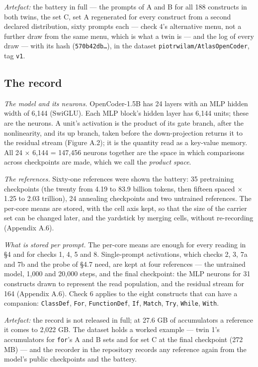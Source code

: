 \documentclass{article}
\begin{document}
\emph{Artefact:} the battery in full --- the prompts of A and B for all 188 constructs in both twins, the set C, set A regenerated for every construct from a second declared distribution, sixty prompts each --- check 4's alternative menu, not a further draw from the same menu, which is what a twin is --- and the log of every draw --- with its hash (\texttt{570b42db\ldots{}}), in the dataset \texttt{piotrwilam/AtlasOpenCoder}, tag \texttt{v1}.

\subsection{The record}

\emph{The model and its neurons.} OpenCoder-1.5B \citep{huang2024} has 24 layers with an MLP hidden width of 6,144 (SwiGLU). Each MLP block's hidden layer has 6,144 units; these are the neurons. A unit's activation is the product of its gate branch, after the nonlinearity, and its up branch, taken before the down-projection returns it to the residual stream (Figure A.2); it is the quantity \citet{geva2021} read as a key-value memory. All 24 $\times$ 6,144 = 147,456 neurons together are the space in which comparisons across checkpoints are made, which we call the \emph{product space}.

\emph{The references.} Sixty-one references were shown the battery: 35 pretraining checkpoints (the twenty from 4.19 to 83.9 billion tokens, then fifteen spaced $\times$1.25 to 2.03 trillion), 24 annealing checkpoints and two untrained references. The per-core means are stored, with the cell axis kept, so that the size of the carrier set can be changed later, and the yardstick by merging cells, without re-recording (Appendix A.6).

\emph{What is stored per prompt.} The per-core means are enough for every reading in \S4 and for checks 1, 4, 5 and 8. Single-prompt activations, which checks 2, 3, 7a and 7b and the probe of \S4.7 need, are kept at four references --- the untrained model, 1,000 and 20,000 steps, and the final checkpoint: the MLP neurons for 31 constructs drawn to represent the read population, and the residual stream for 164 (Appendix A.6). Check 6 applies to the eight constructs that can have a companion: \texttt{ClassDef}, \texttt{For}, \texttt{FunctionDef}, \texttt{If}, \texttt{Match}, \texttt{Try}, \texttt{While}, \texttt{With}.

\emph{Artefact:} the record is not released in full; at 27.6 GB of accumulators a reference it comes to 2,022 GB. The dataset holds a worked example --- twin 1's accumulators for \texttt{for}'s A and B sets and for set C at the final checkpoint (272 MB) --- and the recorder in the repository records any reference again from the model's public checkpoints and the battery.
\end{document}
